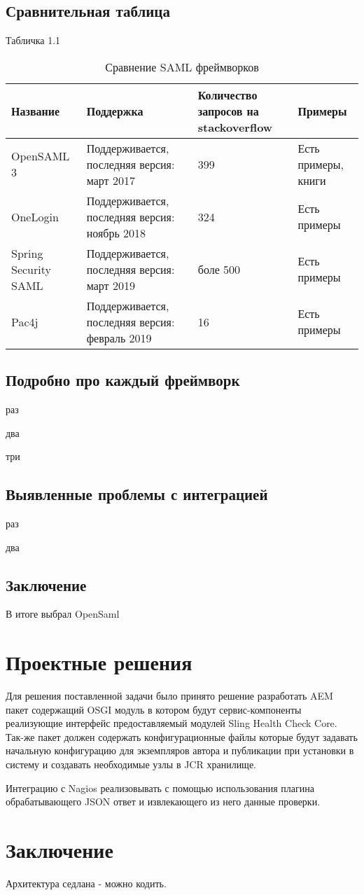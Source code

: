 \subsection{Сравнительная таблица}
Табличка 1.1

\begin{table}[ht]
  \caption{Сравнение SAML \cite{web:wikiSaml} фреймворков}
  \begin{tabular}{|p{3cm}|p{47mm}|p{30mm}|p{35mm}|}
  \hline
  Название      
  & Поддержка 
  & Количество запросов на stackoverflow 
  & Примеры \\
  \hline
  OpenSAML 3  
  & Поддерживается, последняя версия: март 2017
  & 399
  & Есть примеры, книги \\
  \hline
  OneLogin       			   
  & Поддерживается, последняя версия: ноябрь 2018
  & 324
  & Есть примеры \\
  \hline
  Spring Security SAML                
  & Поддерживается, последняя версия: март 2019
  & боле 500
  & Есть примеры \\
  \hline
  Pac4j       			   
  & Поддерживается, последняя версия: февраль 2019
  & 16
  & Есть примеры \\
  \hline
  \end{tabular}
  \label{tab:tabular}
\end{table}	

\subsection{Подробно про каждый фреймворк}
раз

два

три

\subsection{Выявленные проблемы с интеграцией}
раз

два

\subsection{Заключение}
В итоге выбрал OpenSaml

\section{Проектные решения}
Для решения поставленной задачи было принято решение разработать AEM пакет содержащий OSGI модуль в котором будут сервис-компоненты реализующие интерфейс предоставляемый модулей Sling Health Check Core. Так-же пакет должен содержать конфигурационные файлы которые будут задавать начальную конфигурацию для экземпляров автора и публикации при установки в систему и создавать необходимые узлы в JCR хранилище.

Интеграцию с Nagios реализовывать с помощью использования плагина обрабатывающего JSON ответ и извлекающего из него данные проверки.

\section{Заключение}
Архитектура седлана - можно кодить.

